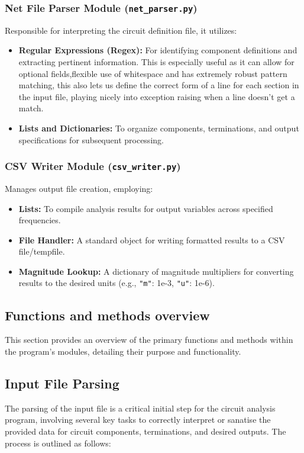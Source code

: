 \documentclass[a4paper]{article}
\begin{document}
\subsubsection*{Net File Parser Module (\texttt{net\_parser.py})}
Responsible for interpreting the circuit definition file, it utilizes:
\begin{itemize}
    \item \textbf{Regular Expressions (Regex):} For identifying component definitions and extracting pertinent information. 
    This is especially useful as it can allow for optional fields,flexible use of whitespace and has extremely robust pattern matching,
    this also lets us define the correct form of a line for each section in the input file, playing nicely into exception raising when a line doesn't get a match.
    \item \textbf{Lists and Dictionaries:} To organize components, terminations, and output specifications for subsequent processing.
\end{itemize}

\subsubsection*{CSV Writer Module (\texttt{csv\_writer.py})}
Manages output file creation, employing:
\begin{itemize}
    \item \textbf{Lists:} To compile analysis results for output variables across specified frequencies.
    \item \textbf{File Handler:} A standard object for writing formatted results to a CSV file/tempfile.
    \item \textbf{Magnitude Lookup:} A dictionary of magnitude multipliers for converting results to the desired units (e.g., \texttt{"m"}: 1e-3, \texttt{"u"}: 1e-6).
\end{itemize}

\subsection{Functions and methods overview}
This section provides an overview of the primary functions and methods within the program's modules, detailing their purpose and functionality.

\subsection*{Input File Parsing}
The parsing of the input file is a critical initial step for the circuit analysis program,
 involving several key tasks to correctly interpret or sanatise the provided data for circuit components,
  terminations, and desired outputs. The process is outlined as follows:
\end{document}
